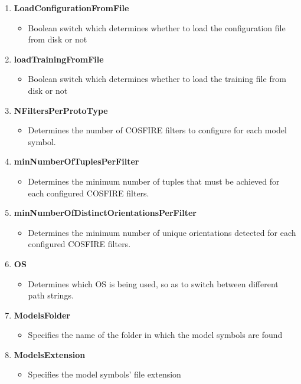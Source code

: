 \begin{enumerate}
\item {\bf LoadConfigurationFromFile}
    \begin{itemize}
        \item Boolean switch which determines whether to load the configuration file from disk or not
    \end{itemize}
\item {\bf loadTrainingFromFile}
    \begin{itemize}
        \item Boolean switch which determines whether to load the training file from disk or not
    \end{itemize}
\item {\bf NFiltersPerProtoType}
    \begin{itemize}
        \item Determines the number of COSFIRE filters to configure for each model symbol.
    \end{itemize}
\item {\bf minNumberOfTuplesPerFilter}
    \begin{itemize}
        \item Determines the minimum number of tuples that must be achieved for each configured COSFIRE filters.
    \end{itemize}
\item {\bf minNumberOfDistinctOrientationsPerFilter}
    \begin{itemize}
        \item Determines the minimum number of unique orientations detected for each configured COSFIRE filters.
    \end{itemize}
\item {\bf OS}
    \begin{itemize}
        \item Determines which OS is being used, so as to switch between different path strings.
    \end{itemize}
\item {\bf ModelsFolder}
    \begin{itemize}
        \item Specifies the name of the folder in which the model symbols are found
    \end{itemize}
\item {\bf ModelsExtension}
    \begin{itemize}
        \item Specifies the model symbols' file extension

\end{itemize}
\end{enumerate}
